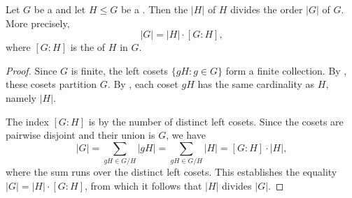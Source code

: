 \begin{theorem} \label{theorem:lagranges_theorem_for_finite_groups}
    Let $G$ be a  and let $H \leq G$ be a . Then the  $|H|$ of $H$ divides the order $|G|$ of $G$. More precisely,
    $$|G| = |H| \cdot [G : H],$$
    where $[G : H]$ is the  of $H$ in $G$.
\end{theorem}
\begin{proof}
    Since $G$ is finite, the left cosets $\{gH : g \in G\}$ form a finite collection. By , these cosets partition $G$. By , each coset $gH$ has the same cardinality as $H$, namely $|H|$.

    The index $[G : H]$ is by  the number of distinct left cosets. Since the cosets are pairwise disjoint and their union is $G$, we have
    $$|G| = \sum_{gH \in G/H} |gH| = \sum_{gH \in G/H} |H| = [G : H] \cdot |H|,$$
    where the sum runs over the distinct left cosets. This establishes the equality $|G| = |H| \cdot [G : H]$, from which it follows that $|H|$ divides $|G|$.
\end{proof}
